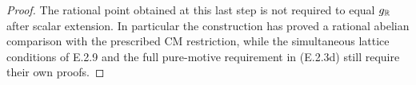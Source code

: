 \begin{proof}
The rational point obtained at this last step is not required to
equal $g_{\mathbb R}$ after scalar extension. In particular the construction
has proved a rational abelian comparison with the prescribed CM
restriction, while the simultaneous lattice conditions of E.2.9
and the full pure-motive requirement in (E.2.3d) still require their
own proofs.
\end{proof}
